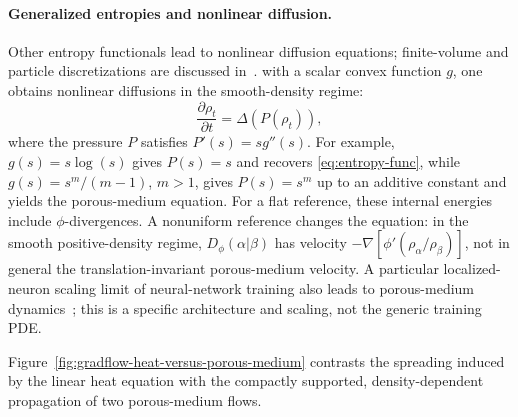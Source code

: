 \paragraph{Generalized entropies and nonlinear diffusion.}
   Other entropy functionals lead to nonlinear diffusion equations; finite-volume and particle discretizations are discussed in~\cite{CarrilloFiniteVolume,GianazzaARMA,Maas2011,ErbarHeatManifold}.
%
	   with a scalar convex function $g$, one obtains nonlinear diffusions in the smooth-density regime:
   \begin{equation*}
	       \frac{\partial \rho_t}{\partial t} = \Delta(P(\rho_t)),
   \end{equation*}
   where the pressure $P$ satisfies $P'(s)=s g''(s)$. For example, $g(s) = s \log(s)$ gives $P(s)=s$ and recovers \eqref{eq:entropy-func}, while $g(s) = s^m/(m-1)$, $m > 1$, gives $P(s)=s^m$ up to an additive constant and yields the porous-medium equation.
For a flat reference, these internal energies include $\phi$-divergences. A nonuniform reference changes the equation: in the smooth positive-density regime, $D_\phi(\alpha|\beta)$ has velocity $-\nabla[\phi'(\rho_\alpha/\rho_\beta)]$, not in general the translation-invariant porous-medium velocity. A particular localized-neuron scaling limit of neural-network training also leads to porous-medium dynamics~\cite{JavanmardMondelliMontanari2020Displacement}; this is a specific architecture and scaling, not the generic training PDE.


Figure~\ref{fig:gradflow-heat-versus-porous-medium} contrasts the spreading induced by the linear heat equation with the compactly supported, density-dependent propagation of two porous-medium flows.

